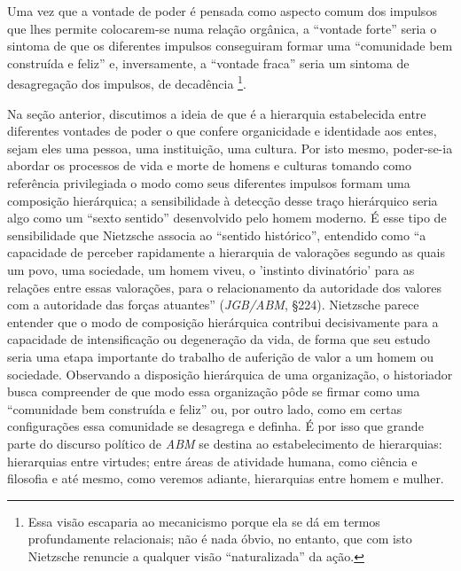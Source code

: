\documentclass[
	12pt,				%
	openright,			%
	oneside,			%
	a4paper,			%
	english,			%
	french,				%
	spanish,			%
	brazil				%
	]{abntex2}
\begin{document}
Uma vez que a vontade de poder é pensada como aspecto comum dos impulsos que lhes permite colocarem-se numa relação orgânica, a “vontade forte” seria o sintoma de que os diferentes impulsos conseguiram formar uma “comunidade bem construída e feliz” e, inversamente, a “vontade fraca” seria um sintoma de desagregação dos impulsos, de decadência
\footnote{Essa visão escaparia ao mecanicismo porque ela se dá em termos profundamente relacionais; não é nada óbvio, no entanto, que com isto Nietzsche renuncie a qualquer visão “naturalizada” da ação.}. 

	Na seção anterior, discutimos a ideia de que é a hierarquia estabelecida entre diferentes vontades de poder o que confere organicidade e identidade aos entes, sejam eles uma pessoa, uma instituição, uma cultura. Por isto mesmo, poder-se-ia abordar os processos de vida e morte de homens e culturas tomando como referência privilegiada o modo como seus diferentes impulsos formam uma composição hierárquica; a sensibilidade à detecção desse traço hierárquico seria algo como um “sexto sentido” desenvolvido pelo homem moderno. É esse tipo de sensibilidade que Nietzsche associa ao “sentido histórico”, entendido como “a capacidade de perceber rapidamente a hierarquia de valorações segundo as quais um povo, uma sociedade, um homem viveu, o 'instinto divinatório' para as relações entre essas valorações, para o relacionamento da autoridade dos valores com a autoridade das forças atuantes” (\textit{JGB/ABM}, §224). Nietzsche parece entender que o modo de composição hierárquica contribui decisivamente para a capacidade de intensificação ou degeneração da vida, de forma que seu estudo seria uma etapa importante do trabalho de auferição de valor a um homem ou sociedade. Observando a disposição hierárquica de uma organização, o historiador busca compreender de que modo essa organização pôde se firmar como uma “comunidade bem construída e feliz” ou, por outro lado, como em certas configurações essa comunidade se desagrega e definha. É por isso que grande parte do discurso político de \textit{ABM} se destina ao estabelecimento de hierarquias: hierarquias entre virtudes; entre áreas de atividade humana, como ciência e filosofia e até mesmo, como veremos adiante, hierarquias entre homem e mulher.
\end{document}
